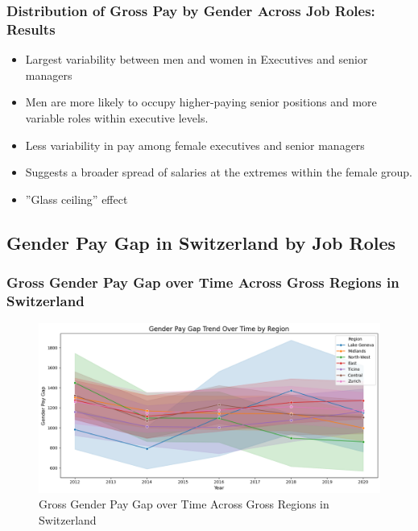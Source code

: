 \documentclass{beamer}
\begin{document}
\begin{frame}
\frametitle{Distribution of Gross Pay by Gender Across Job Roles: Results}
\begin{center}
  \begin{itemize}
    \item Largest variability between men and women in Executives and senior managers
    \item Men are more likely to occupy higher-paying senior positions and more variable roles
within executive levels.
    \item Less variability in pay among female executives and senior managers
    \item Suggests a broader spread of salaries at the extremes within the female group.
    \item  ”Glass ceiling” effect
\end{itemize} 
\end{center}
\end{frame}


\subsection{Gender Pay Gap in Switzerland by Job Roles}

\begin{frame}
\frametitle{Gross Gender Pay Gap over Time Across Gross Regions in Switzerland}
\begin{center}
\begin{figure}[H]
    \includegraphics[width=\textwidth]{Figures/Pay_Gap_Over_Time_Region.png}
    \caption{Gross Gender Pay Gap over Time Across Gross Regions in Switzerland}
    \label{fig:trend_regions}
\end{figure}
\end{center}
\end{frame}
\end{document}
